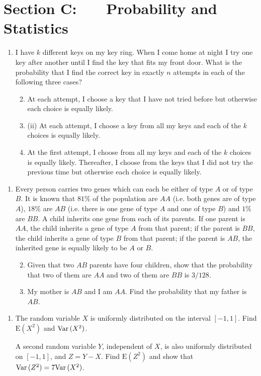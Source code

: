 \documentclass[a4, 11pt]{report}
\newlength{\qspace}
\newcounter{qnumber}
\newenvironment{question}%
 {\vspace{\qspace}
  \begin{enumerate}[\bfseries 1\quad][10]%
    \setcounter{enumi}{\value{qnumber}}%
    \item%
 }
{
  \end{enumerate}
  \filbreak
  \stepcounter{qnumber}
 }
\newenvironment{questionparts}[1][1]%
 {
  \begin{enumerate}[\bfseries (i)]%
    \setcounter{enumii}{#1}
    \addtocounter{enumii}{-1}
    \setlength{\itemsep}{5mm}
    \setlength{\parskip}{8pt}
 }
 {
  \end{enumerate}
 }
\def\E{{\mathrm E}}
\def\var{{\rm Var}\,}
\begin{document}
	
	\newpage
\section*{Section C: \ \ \ Probability and Statistics}


\begin{question}
I have $k$ different keys on my key ring. When I 
come home at night I try one key after another until I 
find the key that fits my front door. What is the probability 
that I find the correct key in exactly $n$ attempts in 
each of the following three cases?
 \begin{questionparts}
 \item At each attempt,
I choose a key that I have not tried 
before but otherwise each choice is equally likely. 
 
\item
[(ii)] At each attempt,
I choose a key from all my 
keys and each of the $k$ choices is equally likely. 
 
\item
At the first attempt,
I choose from all my 
keys and each of the $k$ choices is equally likely. Thereafter, 
I choose from the keys that I did not try the previous time 
but otherwise each choice is equally likely. 
 \end{questionparts}

\end{question}

\begin{question}
Every person  carries two genes which can each be either of 
 type $A$ or of type $B$. 
It is known that $81\%$ of the population are $AA$ (i.e. both genes are 
of type $A$), $18\%$ are $AB$ (i.e. there is one gene of type $A$ 
and one of type $B$) and $1\%$ are $BB$. A child inherits 
one gene from each of its parents. If one parent is $AA$, the child
 inherits a gene of type  $A$ from that parent;  
if the  parent is $BB$, the child
 inherits a gene of type  $B$ from that parent; 
 if the parent 
is $AB$, the inherited gene is equally likely to be $A$ or $B$. 

\begin{questionparts}
\item
Given that two $AB$ parents have four children, 
show that the probability 
that two of them are $AA$ and two of them are $BB$ is $3/128$. 
 
\item
My mother is $AB$ and I am $AA$. 
Find the probability that my father is $AB$.
\end{questionparts} 
\end{question}

\begin{question}
The random variable $X$ is uniformly distributed on the interval
$[-1,1]$. Find $\E(X^2)$ and $\var (X^2)$.

A second random variable $Y$, independent of $X$, is also uniformly
distributed on $[-1,1]$, and $Z=Y-X$. Find $\E(Z^2)$ and show that 
$\var (Z^2) = 7 \var (X^2)$.
\end{question}
	
\end{document}
